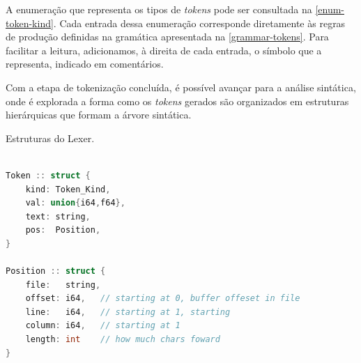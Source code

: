 A enumeração que representa os tipos de \textit{tokens} pode ser consultada na \autoref{enum-token-kind}. Cada entrada dessa enumeração corresponde diretamente às regras de produção definidas na gramática apresentada na \autoref{grammar-tokens}. Para facilitar a leitura, adicionamos, à direita de cada entrada, o símbolo que a representa, indicado em comentários.

Com a etapa de tokenização concluída, é possível avançar para a análise sintática, onde é explorada a forma como os \textit{tokens} gerados são organizados em estruturas hierárquicas que formam a árvore sintática.

\begin{codigo}[htb]
        \caption{\small Estruturas do Lexer. }
        \label{lexer-structs}
\begin{lstlisting}[language=C++]

Token :: struct {
    kind: Token_Kind,
    val: union{i64,f64},
    text: string,
    pos:  Position,
}

Position :: struct {
    file:   string,
    offset: i64,   // starting at 0, buffer offeset in file
    line:   i64,   // starting at 1, starting
    column: i64,   // starting at 1
    length: int    // how much chars foward
}
    
  \end{lstlisting}
\end{codigo}


